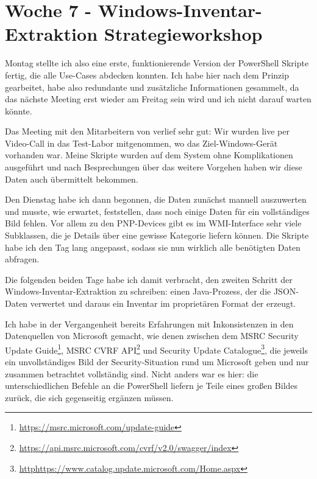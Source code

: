 \section{Woche 7 - Windows-Inventar-Extraktion \headerand Strategieworkshop} \label{sec:bericht-wo-7}



Montag stellte ich also eine erste, funktionierende Version der PowerShell Skripte fertig, die alle Use-Cases abdecken konnten.
Ich habe hier nach dem Prinzip  gearbeitet, habe also redundante und zusätzliche Informationen gesammelt, da das nächste Meeting erst wieder am Freitag sein wird und ich nicht darauf warten könnte.

Das Meeting mit den Mitarbeitern von {\aeclientZEZESE} verlief sehr gut:
Wir wurden live per Video-Call in das Test-Labor mitgenommen, wo das Ziel-Windows-Gerät vorhanden war.
Meine Skripte wurden auf dem System ohne Komplikationen ausgeführt und nach Besprechungen über das weitere Vorgehen haben wir diese Daten auch übermittelt bekommen.


Den Dienstag habe ich dann begonnen, die Daten zunächst manuell auszuwerten und musste, wie erwartet, feststellen, dass noch einige Daten für ein vollständiges Bild fehlen.
Vor allem zu den PNP-Devices gibt es im WMI-Interface sehr viele Subklassen, die je Details über eine gewisse Kategorie liefern können.
Die Skripte habe ich den Tag lang angepasst, sodass sie nun wirklich alle benötigten Daten abfragen.


Die folgenden beiden Tage habe ich damit verbracht, den zweiten Schritt der Windows-Inventar-Extraktion zu schreiben:
einen Java-Prozess, der die JSON-Daten verwertet und daraus ein Inventar im proprietären Format der {\metaeffekt} erzeugt.

Ich habe in der Vergangenheit bereits Erfahrungen mit Inkonsistenzen in den Datenquellen von Microsoft gemacht, wie denen zwischen dem
MSRC Security Update Guide\footnote{\url{https://msrc.microsoft.com/update-guide}},
MSRC CVRF API\footnote{\url{https://api.msrc.microsoft.com/cvrf/v2.0/swagger/index}} und
Security Update Catalogue\footnote{\url{httphttps://www.catalog.update.microsoft.com/Home.aspx}},
die jeweils ein unvollständiges Bild der Security-Situation rund um Microsoft geben und nur zusammen betrachtet vollständig sind.
Nicht anders war es hier:
die unterschiedlichen Befehle an die PowerShell liefern je Teile eines großen Bildes zurück, die sich gegenseitig ergänzen müssen.

